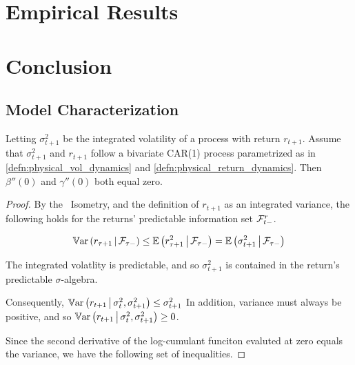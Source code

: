 \documentclass[11pt, letterpaper, twoside, final]{article}
\begin{document}
\section{Empirical Results}

\section{Conclusion}

\newpage

{}
\printbibliography
\newpage

\begin{appendices}


\section{Model Characterization}\label{app:model_characterization}

\begin{lemma}
  \label{lemma:linearity_of_physical_functions}
  Letting $\sigma^2_{t+1}$ be the integrated volatility of a process with return $r_{t+1}$.
  Assume that $\sigma^2_{t+1}$ and $r_{t+1}$ follow a bivariate CAR(1) process parametrized as in
  \cref{defn:physical_vol_dynamics} and \cref{defn:physical_return_dynamics}. 
  Then $\beta''(0)$ and $\gamma''(0)$ both equal zero.
\end{lemma}

\begin{proof}
  By the \Ito\ Isometry, and the definition of $r_{t+1}$ as an integrated variance, the following holds for the
  returns' predictable information set $\mathcal{F}^r_{t-}$. 

  \begin{equation}
    \operatorname{\mathbb{V}ar}\left(r_{\tau+1}\,\middle\vert\, \mathcal{F}_{\tau-}\right) \leq \operatorname{\mathbb{E}}\left(r^2_{\tau+1} \,\middle\vert\, \mathcal{F}_{\tau-}\right) 
    = \operatorname{\mathbb{E}}\left(\sigma^2_{t+1}\,\middle\vert\, \mathcal{F}_{\tau-}\right)
  \end{equation}

  The integrated volatlity is predictable, and so $\sigma^2_{t+1}$ is contained in the return's predictable
  $\sigma$-algebra. 

  Consequently, $\operatorname{\mathbb{V}ar}\left(r_{t+1} \,\middle\vert\, \sigma^2_t, \sigma^2_{t+1}\right) \leq \sigma^2_{t+1}$
  In addition, variance must always be positive, and so $\operatorname{\mathbb{V}ar}\left(r_{t+1} \,\middle\vert\, \sigma^2_t,
  \sigma^2_{t+1}\right) \geq 0$.

  Since the second derivative of the log-cumulant funciton evaluted at zero equals the variance, we have the
  following set of inequalities.


\end{proof}
\end{appendices}
\end{document}

